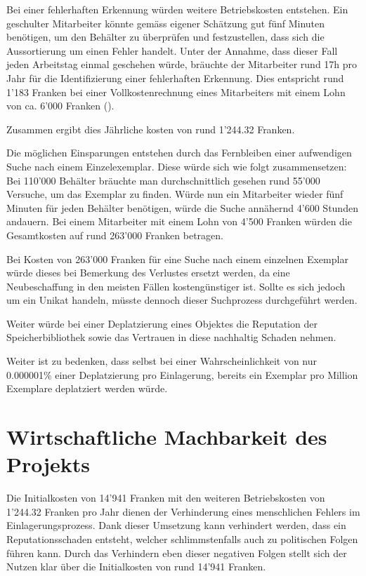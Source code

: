 Bei einer fehlerhaften Erkennung würden weitere Betriebskosten entstehen. Ein geschulter Mitarbeiter könnte gemäss eigener Schätzung gut fünf Minuten benötigen, um den Behälter zu überprüfen und festzustellen, dass sich die Aussortierung um einen Fehler handelt.
Unter der Annahme, dass dieser Fall jeden Arbeitstag einmal geschehen würde, bräuchte der Mitarbeiter rund 17h pro Jahr für die Identifizierung einer fehlerhaften Erkennung. Dies entspricht rund 1'183 Franken bei einer Vollkostenrechnung eines Mitarbeiters mit einem Lohn von ca. 6'000 Franken (\cite{KostenProMitarbeiter2013}).

Zusammen ergibt dies Jährliche kosten von rund 1'244.32 Franken.

Die möglichen Einsparungen entstehen durch das Fernbleiben einer aufwendigen Suche nach einem Einzelexemplar. Diese würde sich wie folgt zusammensetzen:
Bei 110'000 Behälter bräuchte man durchschnittlich gesehen rund 55'000 Versuche, um das Exemplar zu finden. Würde nun ein Mitarbeiter wieder fünf Minuten für jeden Behälter benötigen, würde die Suche annähernd 4'600 Stunden andauern. Bei einem Mitarbeiter mit einem Lohn von 4'500 Franken würden die Gesamtkosten auf rund 263'000 Franken betragen.

Bei Kosten von 263'000 Franken für eine Suche nach einem einzelnen Exemplar würde dieses bei Bemerkung des Verlustes ersetzt werden, da eine Neubeschaffung in den meisten Fällen kostengünstiger ist. Sollte es sich jedoch um ein Unikat handeln, müsste dennoch dieser Suchprozess durchgeführt werden.

Weiter würde bei einer Deplatzierung eines Objektes die Reputation der Speicherbibliothek sowie das Vertrauen in diese nachhaltig Schaden nehmen.

Weiter ist zu bedenken, dass selbst bei einer Wahrscheinlichkeit von nur 0.000001\% einer Deplatzierung pro Einlagerung, bereits ein Exemplar pro Million Exemplare deplatziert werden würde.

\chapter{Wirtschaftliche Machbarkeit des Projekts}
Die Initialkosten von 14'941 Franken mit den weiteren Betriebskosten von 1'244.32 Franken pro Jahr dienen der Verhinderung eines menschlichen Fehlers im Einlagerungsprozess. Dank dieser Umsetzung kann verhindert werden, dass ein Reputationsschaden entsteht, welcher schlimmstenfalls auch zu politischen Folgen führen kann.
Durch das Verhindern eben dieser negativen Folgen stellt sich der Nutzen klar über die Initialkosten von rund 14'941 Franken.

